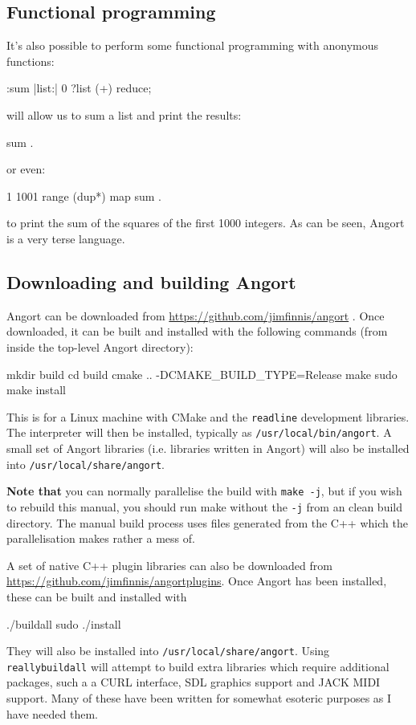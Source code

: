 \subsection{Functional programming}
It's also possible to perform some functional programming with
anonymous functions:
\begin{v}
:sum |list:| 0 ?list (+) reduce;
\end{v}
will allow us to sum a list and print the results:
\begin{v}
[1,2,3,4,5] sum .
\end{v}
or even:
\begin{v}
1 1001 range (dup*) map sum .
\end{v}
to print the sum of the squares of the first 1000 integers.
As can be seen, Angort is a very terse language.

\subsection{Downloading and building Angort}
Angort can be downloaded from \url{https://github.com/jimfinnis/angort} .
Once downloaded, it can be built and installed 
with the following commands (from
inside the top-level Angort directory):
\begin{v}
mkdir build
cd build
cmake .. -DCMAKE_BUILD_TYPE=Release
make
sudo make install
\end{v}
This is for a Linux machine
with CMake and the \texttt{readline} development libraries. The
interpreter will then be installed, typically as \texttt{/usr/local/bin/angort}. 
A small set of Angort libraries (i.e. libraries written in Angort) will also be installed
into \texttt{/usr/local/share/angort}.

\textbf{Note that} you can normally parallelise the build with
\texttt{make -j}, but if you wish to rebuild this manual,
you should run make without the \texttt{-j} from an clean build
directory. The manual build process uses files generated from the
C++ which the parallelisation makes rather a mess of.

A set
of native C++ plugin libraries can also be downloaded from
\url{https://github.com/jimfinnis/angortplugins}. Once Angort has
been installed, these can be built and installed with
\begin{v}
./buildall
sudo ./install
\end{v}
They will also be installed into \texttt{/usr/local/share/angort}.
Using \texttt{reallybuildall} will attempt to build extra libraries
which require additional packages, such a a CURL interface, SDL
graphics support and JACK MIDI support. Many of these have been written for
somewhat esoteric purposes as I have needed them.


